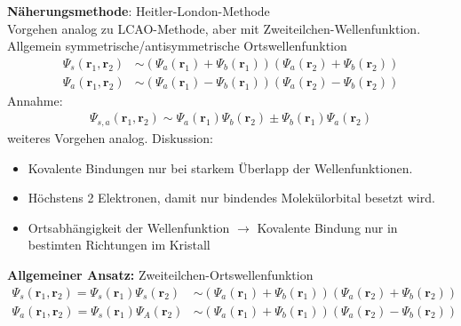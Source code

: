 \textbf{Näherungsmethode}: Heitler-London-Methode\\
Vorgehen analog zu LCAO-Methode, aber mit Zweiteilchen-Wellenfunktion.\\
Allgemein symmetrische/antisymmetrische Ortswellenfunktion
\begin{align*}
	\Psi_s(\textbf{r}_1,\textbf{r}_2) &\sim (\Psi_a(\textbf{r}_1) + \Psi_b(\textbf{r}_1)) (\Psi_a(\textbf{r}_2) + \Psi_b (\textbf{r}_2))\\
	\Psi_a(\textbf{r}_1,\textbf{r}_2) &\sim (\Psi_a(\textbf{r}_1) - \Psi_b(\textbf{r}_1)) (\Psi_a(\textbf{r}_2) - \Psi_b (\textbf{r}_2))
\end{align*}
Annahme:
\begin{align*}
	\Psi_{s,a}(\textbf{r}_1,\textbf{r}_2) \sim \Psi_a(\textbf{r}_1) \Psi_b (\textbf{r}_2) \pm \Psi_b (\textbf{r}_1) \Psi_a (\textbf{r}_2)
\end{align*}
weiteres Vorgehen analog.
Diskussion:
\begin{itemize}
	\item Kovalente Bindungen nur bei starkem Überlapp der Wellenfunktionen.
	\item Höchstens 2 Elektronen, damit nur bindendes Molekülorbital besetzt wird.
	\item Ortsabhängigkeit der Wellenfunktion $\rightarrow$ Kovalente Bindung nur in bestimten Richtungen im Kristall
\end{itemize}

\textbf{Allgemeiner Ansatz:} Zweiteilchen-Ortswellenfunktion
\begin{align*}
	\Psi_s(\textbf{r}_1,\textbf{r}_2) = \Psi_s(\textbf{r}_1) \Psi_s(\textbf{r}_2) &\sim (\Psi_a(\textbf{r}_1) + \Psi_b(\textbf{r}_1)) (\Psi_a(\textbf{r}_2) + \Psi_b (\textbf{r}_2))\\
	\Psi_a(\textbf{r}_1,\textbf{r}_2) = \Psi_s(\textbf{r}_1) \Psi_A(\textbf{r}_2) &\sim (\Psi_a(\textbf{r}_1) + \Psi_b(\textbf{r}_1)) (\Psi_a(\textbf{r}_2) - \Psi_b (\textbf{r}_2))
\end{align*}

